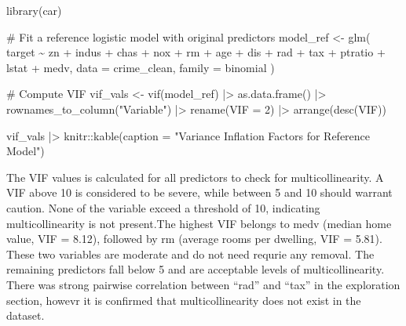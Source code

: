 \documentclass[
  11pt]{article}
\newenvironment{Shaded}{\begin{snugshade}}{\end{snugshade}}
\newcommand{\AttributeTok}[1]{\textcolor[rgb]{0.40,0.45,0.13}{#1}}
\newcommand{\CommentTok}[1]{\textcolor[rgb]{0.37,0.37,0.37}{#1}}
\newcommand{\DecValTok}[1]{\textcolor[rgb]{0.68,0.00,0.00}{#1}}
\newcommand{\FunctionTok}[1]{\textcolor[rgb]{0.28,0.35,0.67}{#1}}
\newcommand{\NormalTok}[1]{\textcolor[rgb]{0.00,0.23,0.31}{#1}}
\newcommand{\OtherTok}[1]{\textcolor[rgb]{0.00,0.23,0.31}{#1}}
\newcommand{\SpecialCharTok}[1]{\textcolor[rgb]{0.37,0.37,0.37}{#1}}
\newcommand{\StringTok}[1]{\textcolor[rgb]{0.13,0.47,0.30}{#1}}
\begin{document}
\begin{Shaded}
\begin{Highlighting}[]
\FunctionTok{library}\NormalTok{(car)}

\CommentTok{\# Fit a reference logistic model with original predictors}
\NormalTok{model\_ref }\OtherTok{\textless{}{-}} \FunctionTok{glm}\NormalTok{(}
\NormalTok{    target }\SpecialCharTok{\textasciitilde{}}\NormalTok{ zn }\SpecialCharTok{+}\NormalTok{ indus }\SpecialCharTok{+}\NormalTok{ chas }\SpecialCharTok{+}\NormalTok{ nox }\SpecialCharTok{+}\NormalTok{ rm }\SpecialCharTok{+}\NormalTok{ age }\SpecialCharTok{+}\NormalTok{ dis }\SpecialCharTok{+}\NormalTok{ rad }\SpecialCharTok{+}\NormalTok{ tax }\SpecialCharTok{+}\NormalTok{ ptratio}
        \SpecialCharTok{+}\NormalTok{ lstat }\SpecialCharTok{+}\NormalTok{ medv,}
    \AttributeTok{data =}\NormalTok{ crime\_clean, }\AttributeTok{family =}\NormalTok{ binomial}
\NormalTok{)}

\CommentTok{\# Compute VIF}
\NormalTok{vif\_vals }\OtherTok{\textless{}{-}} \FunctionTok{vif}\NormalTok{(model\_ref) }\SpecialCharTok{|\textgreater{}}
    \FunctionTok{as.data.frame}\NormalTok{() }\SpecialCharTok{|\textgreater{}}
    \FunctionTok{rownames\_to\_column}\NormalTok{(}\StringTok{"Variable"}\NormalTok{) }\SpecialCharTok{|\textgreater{}}
    \FunctionTok{rename}\NormalTok{(}\AttributeTok{VIF =} \DecValTok{2}\NormalTok{) }\SpecialCharTok{|\textgreater{}}
    \FunctionTok{arrange}\NormalTok{(}\FunctionTok{desc}\NormalTok{(VIF))}

\NormalTok{vif\_vals }\SpecialCharTok{|\textgreater{}}\NormalTok{ knitr}\SpecialCharTok{::}\FunctionTok{kable}\NormalTok{(}\AttributeTok{caption =} \StringTok{"Variance Inflation Factors for Reference Model"}\NormalTok{)}
\end{Highlighting}
\end{Shaded}

The VIF values is calculated for all predictors to check for
multicollinearity. A VIF above 10 is considered to be severe, while
between 5 and 10 should warrant caution. None of the variable exceed a
threshold of 10, indicating multicollinearity is not present.The highest
VIF belongs to medv (median home value, VIF = 8.12), followed by rm
(average rooms per dwelling, VIF = 5.81). These two variables are
moderate and do not need requrie any removal. The remaining predictors
fall below 5 and are acceptable levels of multicollinearity. There was
strong pairwise correlation between ``rad'' and ``tax'' in the
exploration section, howevr it is confirmed that multicollinearity does
not exist in the dataset.
\end{document}
